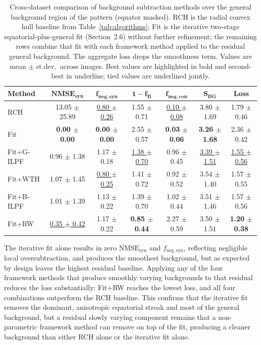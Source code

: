 \documentclass[iucr]{iucrjournals}
\begin{document}
\begin{table}[t]
\caption{Cross-dataset comparison of background subtraction methods over the general background region of the pattern (equator masked). RCH is the radial convex hull baseline from Table~\ref{tab:algorithms}; Fit is the iterative two-stage equatorial-plus-general fit (Section~2.6) without further refinement; the remaining rows combine that fit with each framework method applied to the residual general background. The aggregate loss drops the smoothness term. Values are mean $\pm$ st.dev.\ across images. Best values are highlighted in bold and second-best in underline; tied values are underlined jointly.}
\label{tab:two_stage_full}
\centering
\small
\setlength{\tabcolsep}{3pt}
\renewcommand{\arraystretch}{1.1}
\begin{tabular}{@{}lcccccc@{}}
\toprule
\textbf{Method} & $\mathbf{NMSE}_{\mathbf{syn}}$ & $\mathbf{f}_{\mathbf{neg,syn}}$ & $\mathbf{1-f_B}$ & $\mathbf{f}_{\mathbf{neg,con}}$ & $\mathbf{S}_{\mathbf{BG}}$ & \textbf{Loss} \\
\midrule
RCH & 13.05 $\pm$ 25.89 & \underline{0.80 $\pm$ 0.26} & 1.55 $\pm$ 0.71 & \underline{0.10 $\pm$ 0.08} & 3.80 $\pm$ 1.69 & 1.79 $\pm$ 0.46 \\
Fit & \textbf{0.00 $\pm$ 0.00} & \textbf{0.00 $\pm$ 0.00} & 2.55 $\pm$ 0.57 & \textbf{0.03 $\pm$ 0.06} & \textbf{3.26 $\pm$ 1.68} & 2.36 $\pm$ 0.42 \\
Fit+G-ILPF & 0.96 $\pm$ 1.38 & 1.17 $\pm$ 0.18 & \underline{1.38 $\pm$ 0.70} & 0.96 $\pm$ 0.45 & \underline{3.39 $\pm$ 1.51} & \underline{1.55 $\pm$ 0.56} \\
Fit+WTH & 1.07 $\pm$ 1.45 & \underline{0.80 $\pm$ 0.25} & 1.41 $\pm$ 0.72 & 0.92 $\pm$ 0.52 & 3.54 $\pm$ 1.40 & 1.57 $\pm$ 0.55 \\
Fit+B-ILPF & 1.01 $\pm$ 1.39 & 1.13 $\pm$ 0.22 & 1.39 $\pm$ 0.70 & 1.02 $\pm$ 0.44 & 3.51 $\pm$ 1.46 & 1.57 $\pm$ 0.56 \\
Fit+RW & \underline{0.35 $\pm$ 0.42} & 1.17 $\pm$ 0.22 & \textbf{0.85 $\pm$ 0.44} & 2.27 $\pm$ 0.59 & 3.50 $\pm$ 1.51 & \textbf{1.20 $\pm$ 0.38} \\
\bottomrule
\end{tabular}
\end{table}






The iterative fit alone results in zero $\mathrm{NMSE}_{\mathrm{syn}}$ and $f_{\mathrm{neg,syn}}$, reflecting negligible local oversubtraction, and produces the smoothest background, but as expected by design leaves the highest residual baseline. Applying any of the four framework methods that produce smoothly varying backgrounds to that residual reduces the loss substantially: Fit+RW reaches the lowest loss, and all four combinations outperform the RCH baseline. This confirms that the iterative fit removes the dominant, anisotropic equatorial streak and most of the general background, but a residual slowly varying component remains that a non-parametric framework method can remove on top of the fit, producing a cleaner background than either RCH alone or the iterative fit alone.
\end{document}
